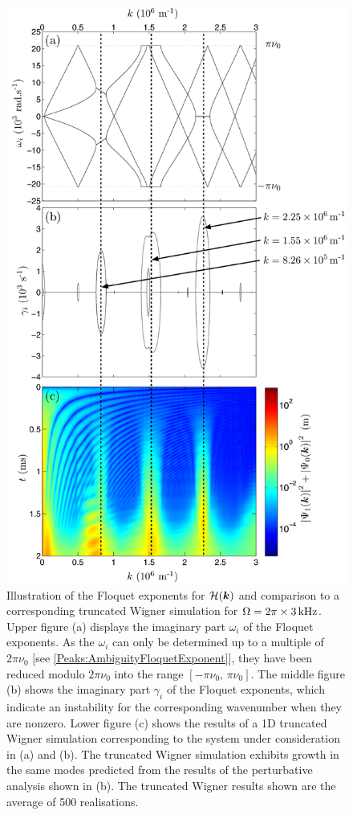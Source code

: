 \begin{figure}
    \centering
    \includegraphics[height=19cm]{CondensateEigenvalues}
    \caption{Illustration of the Floquet exponents for $\mathcal{H}(\bm{k})$ and comparison to a corresponding truncated Wigner simulation for $\Omega = 2\pi \times \unit[3]{kHz}$.
        Upper figure (a) displays the imaginary part $\omega_i$ of the Floquet exponents. As the $\omega_i$ can only be determined up to a multiple of $2\pi\nu_0$ [see \eqref{Peaks:AmbiguityFloquetExponent}], they have been reduced modulo $2\pi\nu_0$ into the range $\left[-\pi\nu_0,\, \pi\nu_0\right]$.
        The middle figure (b) shows the imaginary part $\gamma_i$ of the Floquet exponents, which indicate an instability for the corresponding wavenumber when they are nonzero.
        Lower figure (c) shows the results of a 1D truncated Wigner simulation corresponding to the system under consideration in (a) and (b). The truncated Wigner simulation exhibits growth in the same modes predicted from the results of the perturbative analysis shown in (b). The truncated Wigner results shown are the average of 500 realisations.
        \label{Peaks:CondensateEigenvalues}}
\end{figure}

